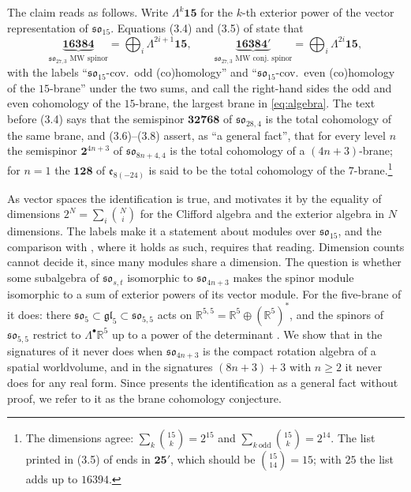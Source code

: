 \documentclass[11pt]{amsart}
\theoremstyle{remark}
\newcommand{\so}{\mathfrak{so}}
\newcommand{\R}{\mathbb{R}}
\begin{document}
The claim reads as follows. Write $\Lambda^k\mathbf{15}$ for the $k$-th exterior power of the vector representation of $\so_{15}$. Equations (3.4) and (3.5) of \cite{RMC20} state that
\begin{equation}\label{eq:claim}
\underbrace{\mathbf{16384}}_{\so_{27,3}\text{ MW spinor}}=\bigoplus_{i}\Lambda^{2i+1}\mathbf{15},\qquad
\underbrace{\mathbf{16384}'}_{\so_{27,3}\text{ MW conj.\ spinor}}=\bigoplus_{i}\Lambda^{2i}\mathbf{15},
\end{equation}
with the labels ``$\so_{15}$-cov.\ odd (co)homology'' and ``$\so_{15}$-cov.\ even (co)homology of the $15$-brane'' under the two sums, and call the right-hand sides the odd and even cohomology of the $15$-brane, the largest brane in \eqref{eq:algebra}. The text before (3.4) says that the semispinor $\mathbf{32768}$ of $\so_{28,4}$ is the total cohomology of the same brane, and (3.6)--(3.8) assert, as ``a general fact'', that for every level $n$ the semispinor $\mathbf{2}^{4n+3}$ of $\so_{8n+4,4}$ is the total cohomology of a $(4n+3)$-brane; for $n=1$ the $\mathbf{128}$ of $\mathfrak{e}_{8(-24)}$ is said to be the total cohomology of the $7$-brane.\footnote{The dimensions agree: $\sum_k\binom{15}{k}=2^{15}$ and $\sum_{k\ \mathrm{odd}}\binom{15}{k}=2^{14}$. The list printed in (3.5) of \cite{RMC20} ends in $\mathbf{25}'$, which should be $\binom{15}{14}=15$; with $25$ the list adds up to $16394$.}

As vector spaces the identification is true, and \cite[(3.3)]{RMC20} motivates it by the equality of dimensions $2^N=\sum_i\binom Ni$ for the Clifford algebra and the exterior algebra in $N$ dimensions. The labels make it a statement about modules over $\so_{15}$, and the comparison with \cite{DVV97}, where it holds as such, requires that reading. Dimension counts cannot decide it, since many modules share a dimension. The question is whether some subalgebra of $\so_{s,t}$ isomorphic to $\so_{4n+3}$ makes the spinor module isomorphic to a sum of exterior powers of its vector module. For the five-brane of \cite{DVV97} it does: there $\so_5\subset\mathfrak{gl}_5\subset\so_{5,5}$ acts on $\R^{5,5}=\R^5\oplus(\R^5)^*$, and the spinors of $\so_{5,5}$ restrict to $\Lambda^\bullet\R^5$ up to a power of the determinant \cite[\S 20.1]{FH91}. We show that in the signatures of \cite{RMC19,RMC20} it never does when $\so_{4n+3}$ is the compact rotation algebra of a spatial worldvolume, and in the signatures $(8n+3)+3$ with $n\ge2$ it never does for any real form. Since \cite{RMC20} presents the identification as a general fact without proof, we refer to it as the brane cohomology conjecture.
\end{document}
